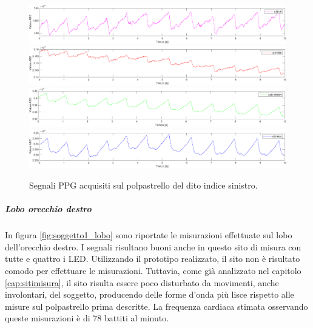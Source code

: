 \begin{figure}[h]
	\centering
	\includegraphics[width=1\linewidth]{ImageFiles/Misure Preliminari/Soggetto 1/polpastrello_ired}
	\includegraphics[width=1\linewidth]{ImageFiles/Misure Preliminari/Soggetto 1/polpastrello_red}
	\includegraphics[width=1\linewidth]{ImageFiles/Misure Preliminari/Soggetto 1/polpastrello_green}
	\includegraphics[width=1\linewidth]{ImageFiles/Misure Preliminari/Soggetto 1/polpastrello_blu}
	\caption{Segnali PPG acquisiti sul polpastrello del dito indice sinistro.}
	\label{fig:soggetto1_polpastrello}
\end{figure}

\clearpage

\subparagraph{Lobo orecchio destro}

In figura \ref{fig:soggetto1_lobo} sono riportate le misurazioni effettuate sul lobo dell'orecchio destro. I segnali risultano buoni anche in questo sito di misura con tutte e quattro i LED. Utilizzando il prototipo realizzato, il sito non è risultato comodo per effettuare le misurazioni. Tuttavia, come già analizzato nel capitolo \ref{cap:sitimisura}, il sito risulta essere poco disturbato da movimenti, anche involontari, del soggetto, producendo delle forme d'onda più lisce rispetto alle misure sul polpastrello prima descritte. La frequenza cardiaca stimata osservando queste misurazioni è di 78 battiti al minuto.

